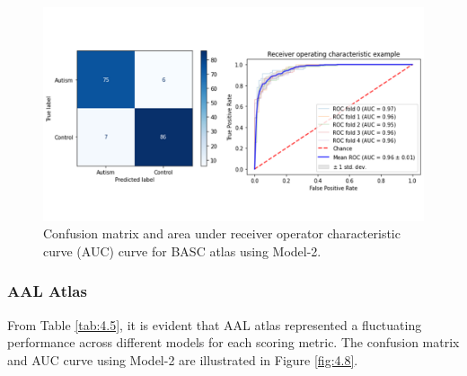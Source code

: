 \begin{figure}[h!]
\centering
\includegraphics[width=\linewidth]{figures/Figure 4.7.png}
\caption{Confusion matrix and area under receiver operator characteristic curve (AUC) curve for BASC atlas using Model-2.}
\label{fig:4.7}
\end{figure}

\subsubsection{AAL Atlas}

From Table \ref{tab:4.5}, it is evident that AAL atlas represented a fluctuating performance across different models for each scoring metric. The confusion matrix and AUC curve using Model-2 are illustrated in Figure \ref{fig:4.8}.

